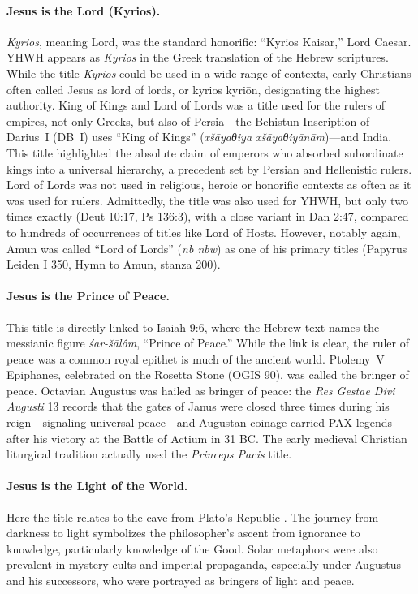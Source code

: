\paragraph{Jesus is the Lord (Kyrios).}\label{par:jesus-is-the-lord-kyrios}
\emph{Kyrios}, meaning Lord, was the standard honorific: “Kyrios Kaisar,” Lord Caesar.
YHWH appears as \emph{Kyrios} in the Greek translation of the Hebrew scriptures.
While the title \emph{Kyrios} could be used in a wide range of contexts, early Christians often called Jesus as lord of lords, or kyrios kyriōn, designating the highest authority.
King of Kings and Lord of Lords was a title used for the rulers of empires, not only Greeks, but also of Persia---the Behistun Inscription of Darius~I (DB~I) uses ``King of Kings'' (\emph{xšāyaθiya xšāyaθiyānām})---and India.
This title highlighted the absolute claim of emperors who absorbed subordinate kings into a universal hierarchy, a precedent set by Persian and Hellenistic rulers.
Lord of Lords was not used in religious, heroic or honorific contexts as often as it was used for rulers.
Admittedly, the title was also used for YHWH, but only two times exactly (Deut 10:17, Ps 136:3), with a close variant in Dan 2:47, compared to hundreds of occurrences of titles like Lord of Hosts.
However, notably again, Amun was called ``Lord of Lords'' (\emph{nb nbw}) as one of his primary titles (Papyrus Leiden I 350, Hymn to Amun, stanza 200).

\paragraph{Jesus is the Prince of Peace.}\label{par:jesus-is-the-prince-of-peace.}
This title is directly linked to Isaiah 9:6, where the Hebrew text names the messianic figure \emph{śar-šālôm}, “Prince of Peace.”
While the link is clear, the ruler of peace was a common royal epithet is much of the ancient world.
Ptolemy~V Epiphanes, celebrated on the Rosetta Stone (OGIS 90), was called the bringer of peace.
Octavian Augustus was hailed as bringer of peace: the \emph{Res Gestae Divi Augusti} 13 records that the gates of Janus were closed three times during his reign---signaling universal peace---and Augustan coinage carried PAX legends after his victory at the Battle of Actium in 31 BC.
The early medieval Christian liturgical tradition actually used the \emph{Princeps Pacis} title.

\paragraph{Jesus is the Light of the World.}\label{par:jesus-is-the-light-of-the-world.}
Here the title relates to the cave from Plato's Republic \cite[514a--520a]{plato:republic}.
The journey from darkness to light symbolizes the philosopher’s ascent from ignorance to knowledge, particularly knowledge of the Good. Solar metaphors were also prevalent in mystery cults and imperial propaganda, especially under Augustus and his successors, who were portrayed as bringers of light and peace.

